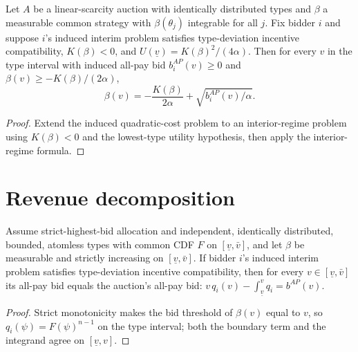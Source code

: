 \begin{theorem}\label{thm:MathEconLib.LinearScarcityAuction.interior_regime_strategy_auction}
\leanok
{}
Let $A$ be a linear-scarcity auction with identically distributed types and $\beta$ a measurable common strategy with $\beta(\theta_j)$ integrable for all $j$. Fix bidder $i$ and suppose $i$'s induced interim problem satisfies type-deviation incentive compatibility, $K(\beta) < 0$, and $U(\underline v) = K(\beta)^2/(4\alpha)$. Then for every $v$ in the type interval with induced all-pay bid $b^{AP}_i(v) \ge 0$ and $\beta(v) \ge -K(\beta)/(2\alpha)$,
\[
  \beta(v) = -\frac{K(\beta)}{2\alpha} + \sqrt{b^{AP}_i(v)/\alpha}.
\]
\end{theorem}
\begin{proof}
\leanok
{}
Extend the induced quadratic-cost problem to an interior-regime problem using $K(\beta) < 0$ and the lowest-type utility hypothesis, then apply the interior-regime formula.
\end{proof}

\section{Revenue decomposition}

\begin{lemma}\label{thm:MathEconLib.Auction.toBidderProblem_allPayBid_eq}
\leanok
{}
Assume strict-highest-bid allocation and independent, identically distributed, bounded, atomless types with common CDF $F$ on $[\underline v, \bar v]$, and let $\beta$ be measurable and strictly increasing on $[\underline v, \bar v]$. If bidder $i$'s induced interim problem satisfies type-deviation incentive compatibility, then for every $v \in [\underline v, \bar v]$ its all-pay bid equals the auction's all-pay bid: $v\,q_i(v) - \int_{\underline v}^v q_i = b^{AP}(v)$.
\end{lemma}
\begin{proof}
\leanok
{}
Strict monotonicity makes the bid threshold of $\beta(v)$ equal to $v$, so $q_i(\psi) = F(\psi)^{n-1}$ on the type interval; both the boundary term and the integrand agree on $[\underline v, v]$.
\end{proof}


